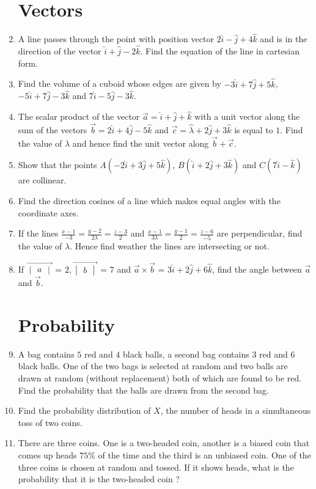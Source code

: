 \documentclass[2pt,-letter paper]{article}
\providecommand{\mydet}[1]{\ensuremath{\begin{vmatrix}#1\end{vmatrix}}}
\providecommand{\brak}[1]{\ensuremath{\left(#1\right)}}
\begin{document}
\begin{enumerate}
\section{Vectors}
\item A line passes through the point with position vector $2\hat{i}-\hat{j}+4\hat{k}$ and is in the direction of the vector $\hat{i}+\hat{j}-2\hat{k}$. Find the equation of the line in cartesian form.
\item Find the volume of a cuboid whose edges are given by $-3\hat{i}+7\hat{j}+5\hat{k}$,$-5\hat{i}+7\hat{j}-3\hat{k}$ and $7\hat{i}-5\hat{j}-3\hat{k}$.
\item The scalar product of the vector $\overrightarrow{a} = \hat{i}+\hat{j}+\hat{k}$ with a unit vector along the sum of the vectors $\overrightarrow{b} = 2\hat{i}+4\hat{j}-5\hat{k}$ and $\overrightarrow{c} = \hat{\lambda}+2\hat{j}+3\hat{k}$ is equal to $1$. Find the value of $\lambda$ and hence find the unit vector along $\overrightarrow{b}+\overrightarrow{c}$.
\item Show that the points $A\brak{-2\hat{i}+3\hat{j}+5\hat{k}}$, $B\brak{\hat{i}+2\hat{j}+3\hat{k}}$ and $C\brak{7\hat{i}-\hat{k}}$ are collinear.
\item Find the direction cosines of a line which makes equal angles with the coordinate axes.
\item If the lines $\frac{x-1}{-3}=\frac{y-2}{2\lambda}=\frac{z-3}{2}$ and $\frac{x-1}{3\lambda}=\frac{y-1}{2}=\frac{z-6}{-5}$ are perpendicular, find the value of $\lambda$. Hence find weather the lines are intersecting or not.
\item If ${\overrightarrow{\mydet{a}}}$ = $2, {\overrightarrow{\mydet{b}}}$ = $7$ and $\overrightarrow{a}\times\overrightarrow{b}$ = $3\hat{i}+2\hat{j}+6\hat{k}$, find the angle between $\overrightarrow{a}$ and $\overrightarrow{b}$.
\section{Probability}
\item A bag contains $5$ red and $4$ black balls, a second bag contains $3$ red and $6$ black balls. One of the two bags is selected at random and two balls are drawn at random (without replacement) both of which are found to be red. Find the probability that the balls are drawn from the second bag.
\item Find the probability distribution of $X$, the number of heads in a simultaneous toss of two coins.
\item There are three coins. One is a two-headed coin, another is a biased coin that comes up heads $75\%$ of the time and the third is an unbiased coin. One of the three coins is chosen at random and tossed. If it shows heads, what is the probability that it is the two-headed coin ?

\end{enumerate}
\end{document}
